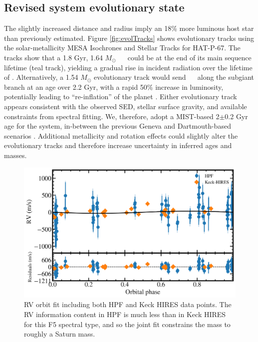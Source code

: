 \documentclass[twocolumn]{aastex631}
\newcommand{\hatp}{\object{HAT-P-67}~}
\newcommand{\hatpb}{\object{HAT-P-67 b}}
\begin{document}
\subsection{Revised system evolutionary state}\label{secMISTtracks}
The slightly increased distance and radius imply an 18\% more luminous host star than previously estimated.  Figure \ref{fig:evolTracks} shows evolutionary tracks using the solar-metallicity MESA \citep{2011ApJS..192....3P,2013ApJS..208....4P,2015ApJS..220...15P} Isochrones and Stellar Tracks \citep[MIST;][]{2016ApJS..222....8D,2016ApJ...823..102C} for HAT-P-67.  The tracks show that a 1.8 Gyr, 1.64 $M_\odot$ \hatp~ could be at the end of its main sequence lifetime (teal track), yielding a gradual rise in incident radiation over the lifetime of \hatpb.  Alternatively, a 1.54 $M_\odot$ evolutionary track would send \hatp~ along the subgiant branch at an age over 2.2 Gyr, with a rapid 50\% increase in luminosity, potentially leading to ``re-inflation'' of the planet \citep{2021ApJ...909L..16T}.  Either evolutionary track appears consistent with the observed SED, stellar surface gravity, and available constraints from spectral fitting.  We, therefore, adopt a MIST-based 2$\pm$0.2 Gyr age for the system, in-between the previous Geneva and Dartmouth-based scenarios \citep{2017AJ....153..211Z}.  Additional metallicity and rotation effects could slightly alter the evolutionary tracks and therefore increase uncertainty in inferred ages and masses.


\begin{figure}
    \includegraphics[width=\linewidth]{figures/HAT-P-67b_rv.pdf}
    \caption{RV orbit fit including both HPF and Keck HIRES data points.  The RV information content in HPF is much less than in Keck HIRES for this F5 spectral type, and so the joint fit constrains the mass to roughly a Saturn mass.}
    \label{fig:RVfit}
\end{figure}
\end{document}
